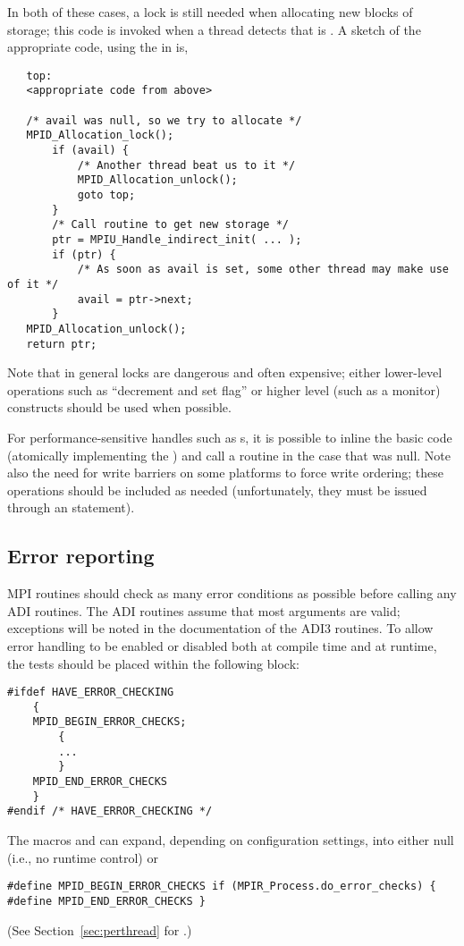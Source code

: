 \documentclass{article}
\begin{document}
In both of these cases, a lock is still
needed when allocating new blocks of storage; this code is invoked when a
thread detects that  is .  A sketch of the appropriate
code, using the  in
 is, 
\begin{verbatim}
   top:
   <appropriate code from above>

   /* avail was null, so we try to allocate */
   MPID_Allocation_lock();
       if (avail) {
           /* Another thread beat us to it */
           MPID_Allocation_unlock();
           goto top;
       }   
       /* Call routine to get new storage */
       ptr = MPIU_Handle_indirect_init( ... );
       if (ptr) {
           /* As soon as avail is set, some other thread may make use of it */
           avail = ptr->next;
       }
   MPID_Allocation_unlock();
   return ptr;
\end{verbatim}
Note that in general locks are dangerous and often expensive; either
lower-level operations such as ``decrement and set flag'' or higher
level (such as a monitor) constructs should be used when possible.  

For performance-sensitive handles such as s, it is
possible to 
inline the basic code (atomically implementing the ) and call a routine in the case that 
was null.  Note also the need for write barriers on some platforms to
force write ordering; these operations should be included as needed
(unfortunately, they must be issued through an  statement).

\subsection{Error reporting}
\label{sec:error-reporting}

MPI routines should check as many error conditions as possible before
calling any ADI routines.  The ADI routines assume that most arguments are
valid; exceptions will be noted in the documentation of the ADI3 routines.
To allow error handling to be enabled or disabled both at compile
time 
and at runtime, the tests should be placed within the following block:
\begin{verbatim}
#ifdef HAVE_ERROR_CHECKING
    {
    MPID_BEGIN_ERROR_CHECKS;
        {
        ...
        }
    MPID_END_ERROR_CHECKS
    }
#endif /* HAVE_ERROR_CHECKING */
\end{verbatim}
The macros  and  can
expand, depending on configuration settings, into either null (i.e.,
no runtime control) or 
\begin{verbatim}
#define MPID_BEGIN_ERROR_CHECKS if (MPIR_Process.do_error_checks) {
#define MPID_END_ERROR_CHECKS }
\end{verbatim}
(See Section~\ref{sec:perthread} for .)
\end{document}
